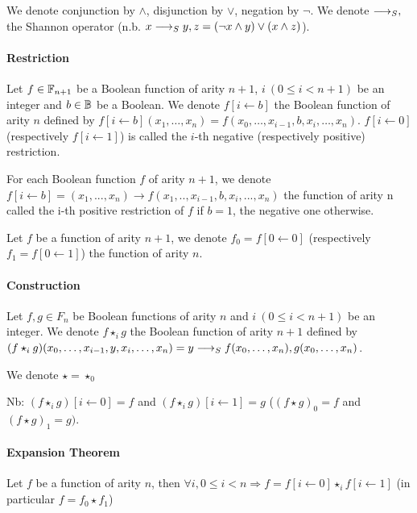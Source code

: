 \documentclass[a4paper,10pt]{article}
\begin{document}
We denote conjunction by $\land$, disjunction by $\lor$, negation by $\lnot$.
We denote $\longrightarrow_S ,$ the Shannon operator (n.b. $x \longrightarrow_S y, z = (\lnot x \land y) \lor (x \land z)$).

\paragraph{Restriction\\}

Let $f\in\mathbb{F}_{n+1}$ be a Boolean function of arity $n+1$, $i~(0\leq i < n+1)$ be an integer and $b\in\mathbb{B}$ be a Boolean.
We denote $f[i\leftarrow b]$ the Boolean function of arity $n$ defined by $f[i\leftarrow b](x_1, \dots, x_n) = f(x_0, \dots, x_{i-1}, b, x_i, \dots, x_n)$.
$f[i\leftarrow 0]$ (respectively $f[i\leftarrow 1]$) is called the $i$-th negative (respectively positive) restriction.

For each Boolean function $f$ of arity $n+1$, we denote $f[i\leftarrow b] = (x_1, ..., x_n) \rightarrow f(x_1, .., x_{i-1}, b, x_i, ..., x_n)$ the function of arity n called the i-th positive restriction of $f$ if $b=1$, the negative one otherwise.


Let $f$ be a function of arity $n+1$, we denote $f_0 = f[0\leftarrow 0]$ (respectively $f_1 = f[0\leftarrow 1]$) the function of arity $n$.

\paragraph{Construction\\}

Let $f, g \in F_n$ be Boolean functions of arity $n$ and $i~(0\leq i < n+1)$ be an integer.
We denote $f\star_ig$ the Boolean function of arity $n+1$ defined by $(f\star_ig)(x_0, \dots, x_{i-1}, y, x_i, \dots, x_n) = y \longrightarrow_S f(x_0, \dots, x_n), g(x_0, \dots, x_n)$.

We denote $\star = \star_0$

Nb: $(f\star_i g)[i\leftarrow 0] = f$ and $ (f\star_i g)[i\leftarrow 1] = g$ ($(f\star g)_0 = f$ and $ (f\star g)_1 = g)$.

\paragraph{Expansion Theorem\\}
Let $f$ be a function of arity $n$, then $\forall i, 0\leq i < n \Rightarrow f = f[i\leftarrow 0]\star_i f[i\leftarrow 1]$ (in particular $f = f_0 \star f_1$)
\end{document}
